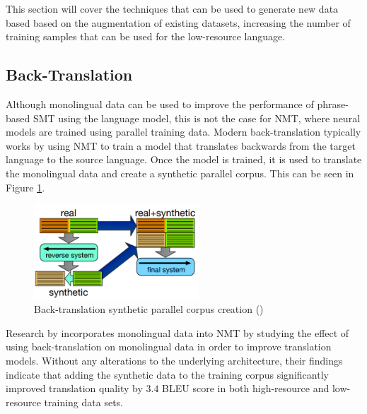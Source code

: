 This section will cover the techniques that can be used to generate new data based based on the augmentation of existing datasets, increasing the number of training samples that can be used for the low-resource language.




\subsection{Back-Translation}
Although monolingual data can be used to improve the performance of phrase-based \acrfull{SMT} using the language model, this is not the case for \acrshort{NMT}, where neural models are trained using parallel training data. Modern back-translation typically works by using \acrshort{NMT} to train a model that translates backwards from the target language to the source language. Once the model is trained, it is used to translate the monolingual data and create a synthetic parallel corpus. This can be seen in Figure \ref{fig:back_trans}.

\begin{figure}[ht!]
\centering
\includegraphics[width=0.55\textwidth]{media/literature/data_argumentation/da_back_trans.png}
\caption[Diagram of the back-translation synthetic parallel corpus]{Back-translation synthetic parallel corpus creation (\cite{hoang_iterative_2018})}
\label{fig:back_trans}
\end{figure}
Research by \cite{sennrich_improving_2016} incorporates monolingual data into \acrshort{NMT} by studying the effect of using back-translation on monolingual data in order to improve translation models.  Without any alterations to the underlying architecture, their findings indicate that adding the synthetic data to the training corpus significantly improved translation quality by $3.4$ BLEU score in both high-resource and low-resource training data sets.



